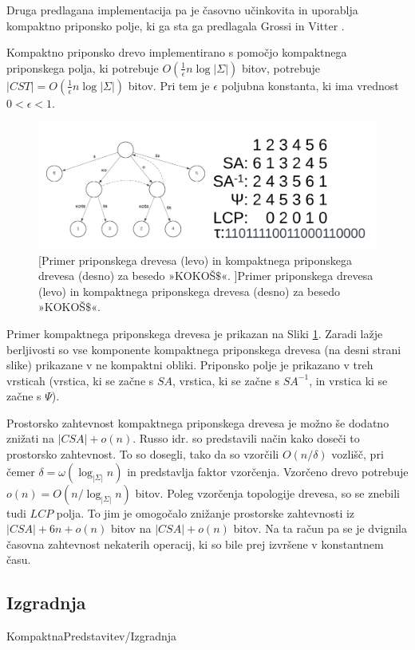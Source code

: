 Druga predlagana implementacija pa je časovno učinkovita in uporablja kompaktno priponsko polje, ki ga sta ga predlagala Grossi in Vitter \cite{Grossi2000}. 
\begin{posl}\label{pos:CSAlog}
Kompaktno priponsko drevo implementirano s pomočjo kompaktnega priponskega polja, ki potrebuje $O(\frac{1}{\epsilon}n\log{| \Sigma|})$ bitov, potrebuje $|CST|=O(\frac{1}{\epsilon}n\log{| \Sigma|})$ bitov. Pri tem je $\epsilon$ poljubna konstanta, ki ima vrednost $0<\epsilon<1$.
\end{posl}

\begin{figure}[tb]
    \begin{center}
        \includegraphics[width=1.03\textwidth]{Slike/KokosCST.png}
        [Primer priponskega drevesa (levo) in kompaktnega priponskega drevesa (desno) za besedo »KOKOŠ$\$$«. ]{Primer priponskega drevesa (levo) in kompaktnega priponskega drevesa (desno) za besedo »KOKOŠ$\$$«.} 
        \label{fig:CST}
    \end{center}
\end{figure}

Primer kompaktnega priponskega drevesa je prikazan na Sliki \ref{fig:CST}. Zaradi lažje berljivosti so vse komponente kompaktnega priponskega drevesa (na desni strani slike) prikazane v ne kompaktni obliki. Priponsko polje je prikazano v treh vrsticah (vrstica, ki se začne s $SA$, vrstica, ki se začne s $SA^{-1}$, in vrstica ki se začne s $\Psi$).

Prostorsko zahtevnost kompaktnega priponskega drevesa je možno še dodatno znižati na $|CSA|+o(n)$. Russo idr. \cite{Russo2008} so predstavili način kako doseči to prostorsko zahtevnost. To so dosegli, tako da so vzorčili $O(n/\delta)$ vozlišč, pri čemer $\delta=\omega(\log_{|\Sigma|}{n})$ in predstavlja faktor vzorčenja. Vzorčeno drevo potrebuje $o(n)=O(n/\log_{|\Sigma|}{n})$ bitov. Poleg vzorčenja topologije drevesa, so se znebili tudi $LCP$ polja. To jim je omogočalo znižanje prostorske zahtevnosti iz $|CSA|+6n+o(n)$ bitov na $|CSA|+o(n)$ bitov. Na ta račun pa se je dvignila časovna zahtevnost nekaterih operacij, ki so bile prej izvršene v konstantnem času.


\subsection{Izgradnja}\label{sec:CSTizgradnja}
{KompaktnaPredstavitev/Izgradnja}



